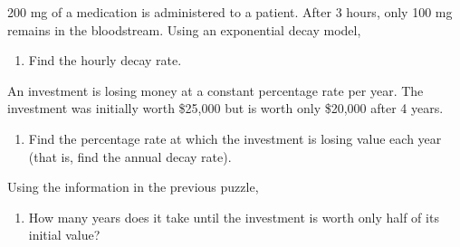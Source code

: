 \begin{puzzle}
    200 mg of a medication is administered to a patient. After 3 hours, only 100 mg remains in the bloodstream. Using an exponential decay model,
    \begin{enumerate}
        \item Find the hourly decay rate.
    \end{enumerate}
\end{puzzle}

\begin{puzzle}
    An investment is losing money at a constant percentage rate per year. The investment was initially worth \$25,000 but is worth only \$20,000 after 4 years.
    \begin{enumerate}
        \item Find the percentage rate at which the investment is losing value each year (that is, find the annual decay rate).
    \end{enumerate}
\end{puzzle}

\begin{puzzle}
    Using the information in the previous puzzle,
    \begin{enumerate}
        \item How many years does it take until the investment is worth only half of its initial value?
    \end{enumerate}
\end{puzzle}

